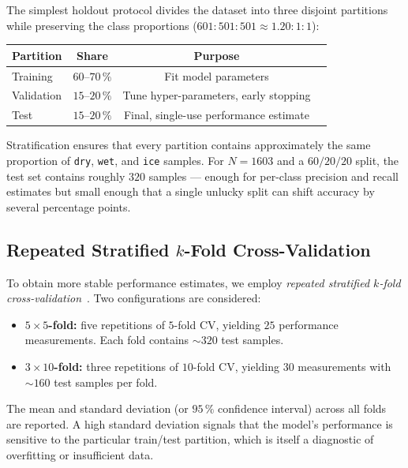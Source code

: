 The simplest holdout protocol divides the dataset into three disjoint
partitions while preserving the class proportions
($601:501:501 \approx 1.20{:}1{:}1$):

\begin{center}
\begin{tabular}{lccc}
\toprule
\textbf{Partition} & \textbf{Share} & \textbf{Purpose} \\
\midrule
Training      & $60$--$70\,\%$ & Fit model parameters \\
Validation    & $15$--$20\,\%$ & Tune hyper-parameters, early stopping \\
Test          & $15$--$20\,\%$ & Final, single-use performance estimate \\
\bottomrule
\end{tabular}
\end{center}

Stratification ensures that every partition contains approximately the
same proportion of \texttt{dry}, \texttt{wet}, and \texttt{ice} samples.
For $N=1603$ and a $60/20/20$ split, the test set contains roughly
$320$ samples — enough for per-class precision and recall estimates but
small enough that a single unlucky split can shift accuracy by several
percentage points.

\subsection{Repeated Stratified $k$-Fold Cross-Validation}
\label{sec:overfit:cv}

To obtain more stable performance estimates, we employ \emph{repeated
stratified $k$-fold cross-validation}~\cite{kohavi1995cv}.  Two
configurations are considered:

\begin{itemize}
  \item \textbf{$5 \times 5$-fold:} five repetitions of $5$-fold CV,
        yielding $25$ performance measurements.  Each fold contains
        ${\sim}320$ test samples.
  \item \textbf{$3 \times 10$-fold:} three repetitions of $10$-fold CV,
        yielding $30$ measurements with ${\sim}160$ test samples per
        fold.
\end{itemize}

The mean and standard deviation (or $95\,\%$ confidence interval) across
all folds are reported.  A high standard deviation signals that the
model's performance is sensitive to the particular train/test partition,
which is itself a diagnostic of overfitting or insufficient data.

